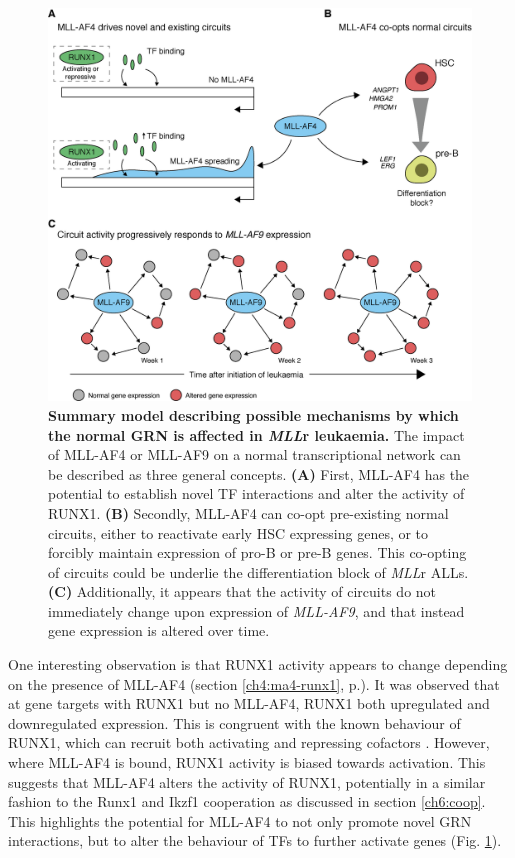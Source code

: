 \begin{figure}[!t]
    \centering
    \includegraphics[width=\textwidth,height=\textheight,keepaspectratio]{figures/models/ch6_model2.png}
    \caption[{Summary model describing possible mechanisms by which the normal GRN is affected in \textit{MLL}r leukaemia.}]
    {\textbf{Summary model describing possible mechanisms by which the normal GRN is affected in \textit{MLL}r leukaemia.}
    The impact of MLL-AF4 or MLL-AF9 on a normal transcriptional network can be described as three general concepts. 
    \textbf{(A)} First, MLL-AF4 has the potential to establish novel TF interactions and alter the activity of RUNX1. 
    \textbf{(B)} Secondly, MLL-AF4 can co-opt pre-existing normal circuits, either to reactivate early HSC expressing genes, or to forcibly maintain expression of pro-B or pre-B genes. This co-opting of circuits could be underlie the differentiation block of \textit{MLL}r ALLs. 
    \textbf{(C)} Additionally, it appears that the activity of circuits do not immediately change upon expression of \textit{MLL-AF9}, and that instead gene expression is altered over time.
    }
    \label{fig:ch6_model2}
\end{figure}

One interesting observation is that RUNX1 activity appears to change depending on the presence of MLL-AF4 (section \ref{ch4:ma4-runx1}, p.\pageref{ch4:ma4-runx1}). It was observed that at gene targets with RUNX1 but no MLL-AF4, RUNX1 both upregulated and downregulated expression. This is congruent with the known behaviour of RUNX1, which can recruit both activating and repressing cofactors \citep{yamagata_runx1aml1_2005, kitabayashi_interaction_1998, perry_runx1aml1_2002, canon_vivo_2003}. However, where MLL-AF4 is bound, RUNX1 activity is biased towards activation. This suggests that MLL-AF4 alters the activity of RUNX1, potentially in a similar fashion to the Runx1 and Ikzf1 cooperation as discussed in section \ref{ch6:coop}. This highlights the potential for MLL-AF4 to not only promote novel GRN interactions, but to alter the behaviour of TFs to further activate genes (Fig. \ref{fig:ch6_model2}).

